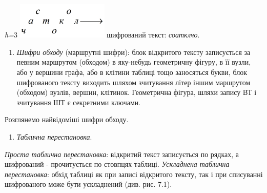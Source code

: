 {\centering
\textit{h}\textit{=}3\textit{  } 
\includegraphics[width=1.7193in,height=0.6799in]{crypt-img/crypt-img63.png} 
шифрований текст: \textit{соатклчо}.
\par}

\liststyleWWviiiNumxli
\setcounter{saveenum}{\value{enumi}}
\begin{enumerate}
\setcounter{enumi}{\value{saveenum}}
\item \textit{Шифри обходу} (маршрутні шифри): блок відкритого тексту
записується за певним маршрутом (обходом) в яку-небудь геометричну фігуру, в її
вузли, або у вершини графа, або в клітини таблиці тощо заносяться букви, блок
шифрованого тексту виходить шляхом зчитування літер іншим маршрутом (обходом)
вузлів, вершин, клітинок. Геометрична фігура, шляхи запису ВТ і зчитування ШТ є
секретними ключами.
\end{enumerate}
 Розглянемо найвідоміші шифри обходу.

\liststyleWWviiiNumxli
\setcounter{saveenum}{\value{enumi}}
\begin{enumerate}
\setcounter{enumi}{\value{saveenum}}
\item  \textit{Таблична перестановка}. 
\end{enumerate}
\textit{Проста таблична перестановка}: відкритий текст записується по рядках,  а
шифрований - прочитується по стовпцях таблиці. \textit{Ускладнена таблична
перестановка}: обхід таблиці як при записі відкритого тексту, так і при
списуванні шифрованого  може бути ускладнений (див. рис. 7.1).

  

